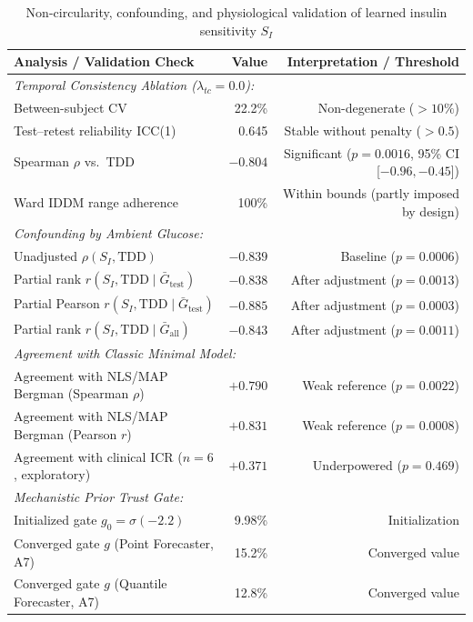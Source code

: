 \documentclass[journal]{IEEEtran}
\begin{document}
\begin{table}[t]
\centering
\caption{Non-circularity, confounding, and physiological validation of learned insulin sensitivity $S_I$}
\label{tab:si_circularity}
\footnotesize
\begin{tabular}{lrr}
\toprule
Analysis / Validation Check & Value & Interpretation / Threshold \\
\midrule
\multicolumn{3}{l}{\textit{Temporal Consistency Ablation ($\lambda_{tc} = 0.0$):}} \\
Between-subject CV & 22.2\% & Non-degenerate ($> 10\%$) \\
Test--retest reliability ICC(1) & 0.645 & Stable without penalty ($> 0.5$) \\
Spearman $\rho$ vs.\ TDD & $-0.804$ & Significant ($p=0.0016$, 95\% CI [$-0.96, -0.45$]) \\
Ward IDDM range adherence & 100\% & Within bounds (partly imposed by design) \\
\midrule
\multicolumn{3}{l}{\textit{Confounding by Ambient Glucose:}} \\
Unadjusted $\rho(S_I, \text{TDD})$ & $-0.839$ & Baseline ($p = 0.0006$) \\
Partial rank $r(S_I, \text{TDD} \mid \bar{G}_{\text{test}})$ & $-0.838$ & After adjustment ($p = 0.0013$) \\
Partial Pearson $r(S_I, \text{TDD} \mid \bar{G}_{\text{test}})$ & $-0.885$ & After adjustment ($p = 0.0003$) \\
Partial rank $r(S_I, \text{TDD} \mid \bar{G}_{\text{all}})$ & $-0.843$ & After adjustment ($p = 0.0011$) \\
\midrule
\multicolumn{3}{l}{\textit{Agreement with Classic Minimal Model:}} \\
Agreement with NLS/MAP Bergman (Spearman $\rho$) & $+0.790$ & Weak reference ($p = 0.0022$) \\
Agreement with NLS/MAP Bergman (Pearson $r$) & $+0.831$ & Weak reference ($p = 0.0008$) \\
Agreement with clinical ICR ($n=6$, exploratory) & $+0.371$ & Underpowered ($p = 0.469$) \\
\midrule
\multicolumn{3}{l}{\textit{Mechanistic Prior Trust Gate:}} \\
Initialized gate $g_0 = \sigma(-2.2)$ & 9.98\% & Initialization \\
Converged gate $g$ (Point Forecaster, A7) & 15.2\% & Converged value \\
Converged gate $g$ (Quantile Forecaster, A7) & 12.8\% & Converged value \\
\bottomrule
\end{tabular}
\end{table}
\end{document}
